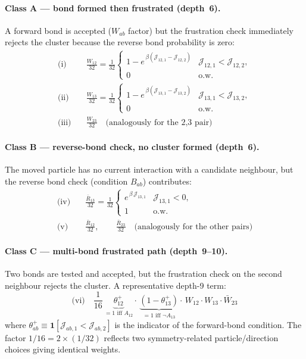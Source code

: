 \documentclass[11pt,a4paper]{article}
\newcommand{\J}[2]{\mathcal{J}_{#1,#2}}
\newcommand{\W}[1]{W_{#1}}
\newcommand{\Wb}[1]{\bar{W}_{#1}}
\newcommand{\Rb}[1]{\bar{R}_{#1}}
\newcommand{\Afwd}[1]{\theta^{+}_{#1}}
\begin{document}
\paragraph{Class A --- bond formed then frustrated (depth~6).}
A forward bond is accepted ($\W{ab}$ factor) but the frustration check
immediately rejects the cluster because the reverse bond probability is zero:
\begin{align}
  \text{(i)}\quad&\frac{\W{12}}{32}
    = \frac{1}{32}\begin{cases}
        1-e^{\,\beta(\J{12}{1}-\J{12}{2})} & \J{12}{1}<\J{12}{2},\\0&\text{o.w.}
      \end{cases}\\[4pt]
  \text{(ii)}\quad&\frac{\W{13}}{32}
    = \frac{1}{32}\begin{cases}
        1-e^{\,\beta(\J{13}{1}-\J{13}{2})} & \J{13}{1}<\J{13}{2},\\0&\text{o.w.}
      \end{cases}\\[4pt]
  \text{(iii)}\quad&\frac{\W{23}}{32}
    \quad\text{(analogously for the 2,3 pair)}
\end{align}

\paragraph{Class B --- reverse-bond check, no cluster formed (depth~6).}
The moved particle has no current interaction with a candidate neighbour, but
the reverse bond check (condition $B_{ab}$) contributes:
\begin{align}
  \text{(iv)}\quad&\frac{\Rb{13}}{32}
    = \frac{1}{32}\begin{cases}
        e^{\,\beta\,\J{13}{1}} & \J{13}{1}<0,\\1&\text{o.w.}
      \end{cases}\\[4pt]
  \text{(v)}\quad&\frac{\Rb{12}}{32},\qquad
  \frac{\Rb{23}}{32}
    \quad\text{(analogously for the other pairs)}
\end{align}

\paragraph{Class C --- multi-bond frustrated path (depth~9--10).}
Two bonds are tested and accepted, but the frustration check on the second
neighbour rejects the cluster.  A representative depth-9 term:
\begin{equation}
  \text{(vi)}\quad\frac{1}{16}\,
    \underbrace{\Afwd{12}}_{=1\text{ iff }A_{12}}\!\cdot\,
    \underbrace{(1-\Afwd{13})}_{=1\text{ iff }\neg A_{13}}\!\cdot\,
    \W{12}\cdot\W{13}\cdot\Wb{23}
\end{equation}
where $\Afwd{ab}\equiv\mathbf{1}[\J{ab}{1}<\J{ab}{2}]$ is the indicator
of the forward-bond condition.  The factor $1/16=2\times(1/32)$ reflects
two symmetry-related particle/direction choices giving identical weights.
\end{document}
